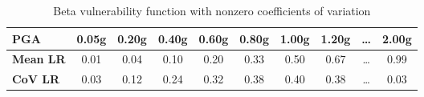 \begin{table}[htbp]

\centering
\begin{tabular}{ l c c c c c c c c c }

\hline
\rowcolor{anti-flashwhite}
\bf{PGA} & \bf{0.05g} & \bf{0.20g} & \bf{0.40g} & \bf{0.60g} & \bf{0.80g} & \bf{1.00g} & \bf{1.20g} & \bf{\dots} & \bf{2.00g} \\
\hline
\bf{Mean LR} & 0.01 & 0.04 & 0.10 & 0.20 & 0.33 & 0.50 & 0.67 & \dots & 0.99 \\
\bf{CoV LR} & 0.03 & 0.12 & 0.24 & 0.32 & 0.38 & 0.40 & 0.38 & \dots & 0.03 \\
\hline
\end{tabular}

\caption{Beta vulnerability function with nonzero coefficients of variation}
\label{tab:vf-bt-tax1-nzcov}
\end{table}